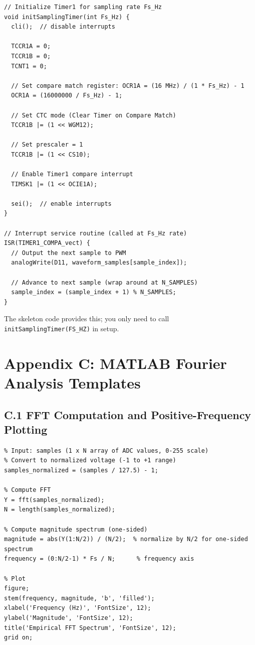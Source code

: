 \documentclass[11pt,letterpaper]{article}
\begin{document}
\begin{verbatim}
// Initialize Timer1 for sampling rate Fs_Hz
void initSamplingTimer(int Fs_Hz) {
  cli();  // disable interrupts

  TCCR1A = 0;
  TCCR1B = 0;
  TCNT1 = 0;

  // Set compare match register: OCR1A = (16 MHz) / (1 * Fs_Hz) - 1
  OCR1A = (16000000 / Fs_Hz) - 1;

  // Set CTC mode (Clear Timer on Compare Match)
  TCCR1B |= (1 << WGM12);

  // Set prescaler = 1
  TCCR1B |= (1 << CS10);

  // Enable Timer1 compare interrupt
  TIMSK1 |= (1 << OCIE1A);

  sei();  // enable interrupts
}

// Interrupt service routine (called at Fs_Hz rate)
ISR(TIMER1_COMPA_vect) {
  // Output the next sample to PWM
  analogWrite(D11, waveform_samples[sample_index]);

  // Advance to next sample (wrap around at N_SAMPLES)
  sample_index = (sample_index + 1) % N_SAMPLES;
}
\end{verbatim}

The skeleton code provides this; you only need to call \texttt{initSamplingTimer(FS\_HZ)} in setup.

\clearpage

\section*{Appendix C: MATLAB Fourier Analysis Templates}

\subsection*{C.1 FFT Computation and Positive-Frequency Plotting}

\begin{verbatim}
% Input: samples (1 x N array of ADC values, 0-255 scale)
% Convert to normalized voltage (-1 to +1 range)
samples_normalized = (samples / 127.5) - 1;

% Compute FFT
Y = fft(samples_normalized);
N = length(samples_normalized);

% Compute magnitude spectrum (one-sided)
magnitude = abs(Y(1:N/2)) / (N/2);  % normalize by N/2 for one-sided spectrum
frequency = (0:N/2-1) * Fs / N;      % frequency axis

% Plot
figure;
stem(frequency, magnitude, 'b', 'filled');
xlabel('Frequency (Hz)', 'FontSize', 12);
ylabel('Magnitude', 'FontSize', 12);
title('Empirical FFT Spectrum', 'FontSize', 12);
grid on;
\end{verbatim}
\end{document}
